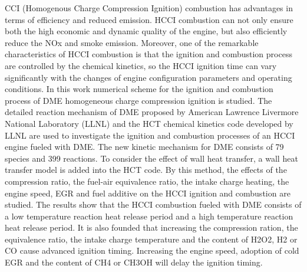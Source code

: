 \begin{abstractEn}
CCI (Homogenous Charge Compression Ignition) combustion has advantages in terms of efficiency and reduced emission. HCCI combustion can not only ensure both the high economic and dynamic quality of the engine, but also efficiently reduce the NOx and smoke emission. Moreover, one of the remarkable characteristics of HCCI combustion is that the ignition and combustion process are controlled by the chemical kinetics, so the HCCI ignition time can vary significantly with the changes of engine configuration parameters and operating conditions. In this work numerical scheme for the ignition and combustion process of DME homogeneous charge compression ignition is studied. The detailed reaction mechanism of DME proposed by American Lawrence Livermore National Laboratory (LLNL) and the HCT chemical kinetics code developed by LLNL are used to investigate the ignition and combustion processes of an HCCI engine fueled with DME. The new kinetic mechanism for DME consists of 79 species and 399 reactions. To consider the effect of wall heat transfer, a wall heat transfer model is added into the HCT code. By this method, the effects of the compression ratio, the fuel-air equivalence ratio, the intake charge heating, the engine speed, EGR and fuel additive on the HCCI ignition and combustion are studied. The results show that the HCCI combustion fueled with DME consists of a low temperature reaction heat release period and a high temperature reaction heat release period. It is also founded that increasing the compression ration, the equivalence ratio, the intake charge temperature and the content of H2O2, H2 or CO cause advanced ignition timing. Increasing the engine speed, adoption of cold EGR and the content of CH4 or CH3OH will delay the ignition timing.
\end{abstractEn}